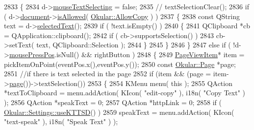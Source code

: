 \begin{DoxyCode}
{{2833                 \{
2834                     d->\hyperlink{classPageViewPrivate_a64e9f3610cf2b731a3c0c4eae976e687}{mouseTextSelecting} = \textcolor{keyword}{false};
2835 \textcolor{comment}{//                    textSelectionClear();}
2836                     \textcolor{keywordflow}{if} ( d->\hyperlink{classPageViewPrivate_a50645b9853306cffd74e51efb677e5b4}{document}->\hyperlink{classOkular_1_1Document_a6dd7a475b14222c07d1c410311f35cdb}{isAllowed}( 
      \hyperlink{namespaceOkular_a3601f4e702453ddf1125476dd6e7577ba36a60050e67a446a5ff61aac6756718c}{Okular::AllowCopy} ) )
2837                     \{
2838                         \textcolor{keyword}{const} QString text = d->\hyperlink{classPageViewPrivate_a0ecc0d9ad35e6990bc4b82f3649fc6c4}{selectedText}();
2839                         \textcolor{keywordflow}{if} ( !text.isEmpty() )
2840                         \{
2841                             QClipboard *cb = QApplication::clipboard();
2842                             \textcolor{keywordflow}{if} ( cb->supportsSelection() )
2843                                 cb->setText( text, QClipboard::Selection );
2844                         \}
2845                     \}
2846                 \}
2847                 \textcolor{keywordflow}{else} \textcolor{keywordflow}{if} ( !d->\hyperlink{classPageViewPrivate_aa4799ae3aa24957d19a95220d8f61216}{mousePressPos}.isNull() && rightButton )
2848                 \{
2849                     \hyperlink{classPageViewItem}{PageViewItem}* item = pickItemOnPoint(eventPos.x(),eventPos.y());
2850                     \textcolor{keyword}{const} \hyperlink{classOkular_1_1Page}{Okular::Page} *page;
2851                     \textcolor{comment}{//if there is text selected in the page}
2852                     \textcolor{keywordflow}{if} (item && (page = item->\hyperlink{classPageViewItem_a5c512d95e5563e8d19d1fb3d93dafc31}{page}())->textSelection())
2853                     \{
2854                         KMenu menu( \textcolor{keyword}{this} );
2855                         QAction *textToClipboard = menu.addAction( KIcon( \textcolor{stringliteral}{"edit-copy"} ), i18n( \textcolor{stringliteral}{"Copy Text"} 
      ) );
2856                         QAction *speakText = 0;
2857                         QAction *httpLink = 0;
2858                         \textcolor{keywordflow}{if} ( \hyperlink{classOkular_1_1Settings_a165dd0c56407e353bda8a773fa1ad485}{Okular::Settings::useKTTSD}() )
2859                             speakText = menu.addAction( KIcon( \textcolor{stringliteral}{"text-speak"} ), i18n( \textcolor{stringliteral}{"Speak Text"} ) );
}}
\end{DoxyCode}

